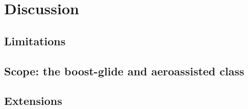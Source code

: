 
\section{Discussion}
\label{sec:discussion}

\subsection{Limitations}
\label{sub:limitations}

\subsection{Scope: the boost-glide and aeroassisted class}
\label{sub:scope_boost_glide_class}

\subsection{Extensions}
\label{sub:extensions}
